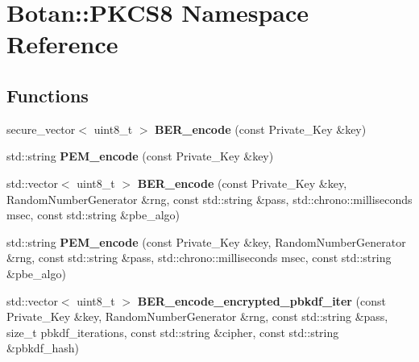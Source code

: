 \hypertarget{namespace_botan_1_1_p_k_c_s8}{}\section{Botan\+:\+:P\+K\+C\+S8 Namespace Reference}
\label{namespace_botan_1_1_p_k_c_s8}
\subsection*{Functions}
\begin{DoxyCompactItemize}
\item 
\mbox{\label{namespace_botan_1_1_p_k_c_s8_ab38d9070f3641a1c0a01293eabb1c503}} 
secure\+\_\+vector$<$ uint8\+\_\+t $>$ {\bfseries B\+E\+R\+\_\+encode} (const Private\+\_\+\+Key \&key)
\item 
\mbox{\label{namespace_botan_1_1_p_k_c_s8_a077362bdd5cb9b2d1beb52a4de61a8f9}} 
std\+::string {\bfseries P\+E\+M\+\_\+encode} (const Private\+\_\+\+Key \&key)
\item 
\mbox{\label{namespace_botan_1_1_p_k_c_s8_a0b492a201c4bb86bd4fcfddbe727faef}} 
std\+::vector$<$ uint8\+\_\+t $>$ {\bfseries B\+E\+R\+\_\+encode} (const Private\+\_\+\+Key \&key, Random\+Number\+Generator \&rng, const std\+::string \&pass, std\+::chrono\+::milliseconds msec, const std\+::string \&pbe\+\_\+algo)
\item 
\mbox{\label{namespace_botan_1_1_p_k_c_s8_a05243f48ff302175572e7f27b2b4232e}} 
std\+::string {\bfseries P\+E\+M\+\_\+encode} (const Private\+\_\+\+Key \&key, Random\+Number\+Generator \&rng, const std\+::string \&pass, std\+::chrono\+::milliseconds msec, const std\+::string \&pbe\+\_\+algo)
\item 
\mbox{\label{namespace_botan_1_1_p_k_c_s8_ae0d51558d0bbb0c766905dea77ec2040}} 
std\+::vector$<$ uint8\+\_\+t $>$ {\bfseries B\+E\+R\+\_\+encode\+\_\+encrypted\+\_\+pbkdf\+\_\+iter} (const Private\+\_\+\+Key \&key, Random\+Number\+Generator \&rng, const std\+::string \&pass, size\+\_\+t pbkdf\+\_\+iterations, const std\+::string \&cipher, const std\+::string \&pbkdf\+\_\+hash)
\item 
\mbox{\label{namespace_botan_1_1_p_k_c_s8_abaf15563bd9be9763e39a44ef10fb8ce}} 

\end{DoxyCompactItemize}

